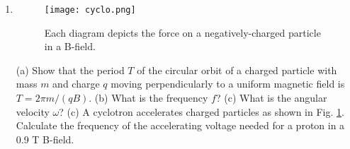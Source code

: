 \documentclass[10pt]{article}
\begin{document}
\begin{enumerate}
\begin{enumerate}
\item 
\begin{figure}[hb]
\centering
\texttt{[image: cyclo.png]}
\caption{\label{fig:cyclo} Each diagram depicts the force on a negatively-charged particle in a B-field.}
\end{figure}
(a) Show that the period $T$ of the circular orbit of a charged particle with mass $m$ and charge $q$ moving perpendicularly to a uniform magnetic field is $T = 2\pi m/(qB)$. (b) What is the frequency $f$? (c) What is the angular velocity $\omega$?  (c) A cyclotron accelerates charged particles as shown in Fig. \ref{fig:cyclo}. Calculate the frequency of the accelerating voltage needed for a proton in a 0.9 T B-field.
\end{enumerate}
\end{enumerate}
\end{document}
